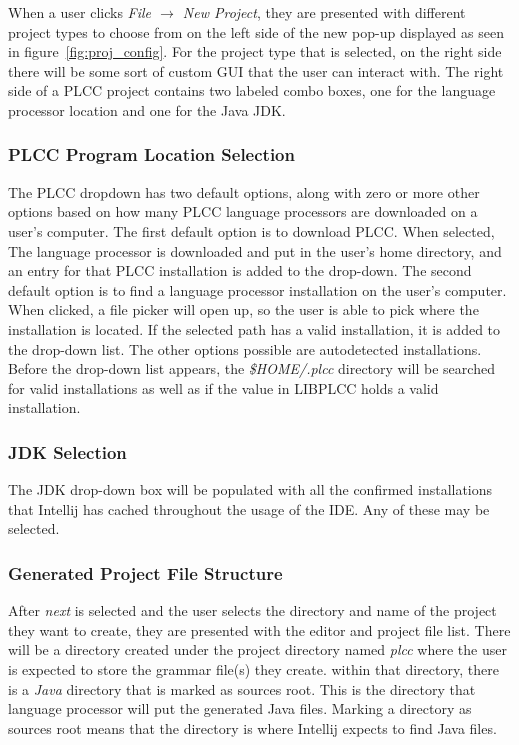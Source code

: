 \documentclass[conference, letterpaper]{IEEEtran}
\begin{document}
When a user clicks \textit{File $\rightarrow$ New Project}, they are presented with different project types to choose from on the left side of the new pop-up displayed as seen in figure~\ref{fig:proj_config}.
For the project type that is selected, on the right side there will be some sort of custom GUI that the user can interact with.
The right side of a PLCC project contains two labeled combo boxes, one for the language processor location and one for the Java JDK.

\subsubsection{PLCC Program Location Selection}\label{subsubsec:plcc-program-location}
The PLCC dropdown has two default options, along with zero or more other options based on how many PLCC language processors are downloaded on a user's computer.
The first default option is to download PLCC\@.
When selected, The language processor is downloaded and put in the user's home directory, and an entry for that PLCC installation is added to the drop-down.
The second default option is to find a language processor installation on the user's computer.
When clicked, a file picker will open up, so the user is able to pick where the installation is located.
If the selected path has a valid installation, it is added to the drop-down list.
The other options possible are autodetected installations.
Before the drop-down list appears, the \textit{\$HOME/.plcc} directory will be searched for valid installations as well as if the value in LIBPLCC holds a valid installation.

\subsubsection{JDK Selection}\label{subsubsec:jdk-installation}
The JDK drop-down box will be populated with all the confirmed installations that Intellij has cached throughout the usage of the IDE. Any of these may be selected.

\subsubsection{Generated Project File Structure}\label{subsubsec:generated-project-file-structure}
After \textit{next} is selected and the user selects the directory and name of the project they want to create, they are presented with the editor and project file list.
There will be a directory created under the project directory named \textit{plcc} where the user is expected to store the grammar file(s) they create.
within that directory, there is a \textit{Java} directory that is marked as sources root.
This is the directory that language processor will put the generated Java files.
Marking a directory as sources root means that the directory is where Intellij expects to find Java files.
\end{document}
